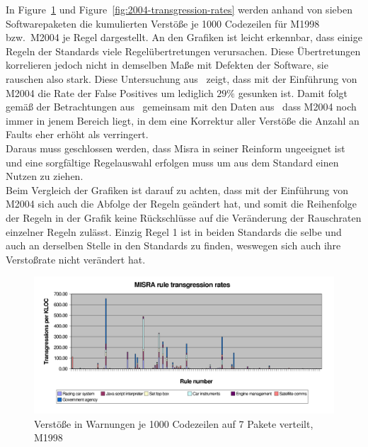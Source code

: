 \documentclass[a4paper,UKenglish,cleveref, autoref]{templates/lipics-v2019}
\begin{document}
    In Figure~\ref{fig:1998-transgression-rates} und Figure~\ref{fig:2004-transgression-rates} werden anhand von sieben
    Softwarepaketen die kumulierten Verstöße je 1000 Codezeilen für M1998 bzw.\ M2004 je Regel dargestellt.
    An den Grafiken ist leicht erkennbar, dass einige Regeln der Standards viele Regelübertretungen verursachen.
    Diese Übertretungen korrelieren jedoch nicht in demselben Maße mit Defekten der Software, sie rauschen also stark.
    Diese Untersuchung aus~\cite{hatton2007language} zeigt, dass mit der Einführung von M2004 die Rate der False Positives
    um lediglich $29\%$ gesunken ist.
    Damit folgt gemäß der Betrachtungen aus~\cite{hatton2007language} gemeinsam mit den Daten aus~\cite{transgression-data}
    dass M2004 noch immer in jenem Bereich liegt, in dem eine Korrektur aller Verstöße die Anzahl an Faults
    eher erhöht als verringert.\\
    Daraus muss geschlossen werden, dass Misra in seiner Reinform ungeeignet ist und eine sorgfältige Regelauswahl erfolgen
    muss um aus dem Standard einen Nutzen zu ziehen.\\
    Beim Vergleich der Grafiken ist darauf zu achten, dass mit der Einführung von M2004 sich auch die Abfolge der Regeln
    geändert hat, und somit die Reihenfolge der Regeln in der Grafik keine Rückschlüsse auf die Veränderung der
    Rauschraten einzelner Regeln zulässt.
    Einzig Regel 1 ist in beiden Standards die selbe und auch an derselben Stelle in den Standards zu finden, weswegen sich
    auch ihre Verstoßrate nicht verändert hat.

    \begin{figure}[H]
        \centering
        \captionsetup{justification=centering,margin=2cm}
        \includegraphics[width=\textwidth]{graphics/1998-transgression-rates.png}
        \caption{Verstöße in Warnungen je 1000 Codezeilen auf 7 Pakete verteilt, M1998\cite{hatton2007language}}
        \label{fig:1998-transgression-rates}
    \end{figure}
\end{document}
